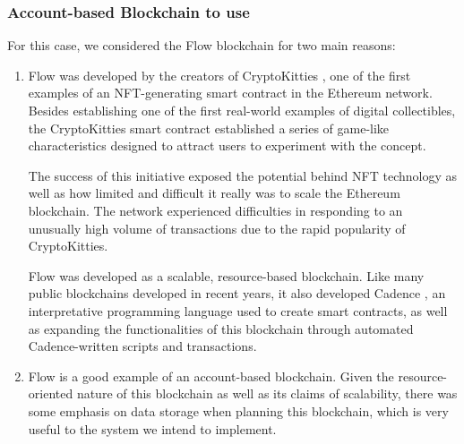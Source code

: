 \documentclass[./4_GeneralApproach.tex]{subfiles}
\begin{document}
    \subsubsection{Account-based Blockchain to use}
    For this case, we considered the Flow blockchain for two main reasons:
        \begin{enumerate}
            \item{Flow \cite{Hentschel2019a} was developed by the creators of CryptoKitties \cite{Gharegozlou2019}, one of the first examples of an NFT-generating smart contract in the Ethereum network. Besides establishing one of the first real-world examples of digital collectibles, the CryptoKitties smart contract established a series of game-like characteristics designed to attract users to experiment with the concept.
            \par
            The success of this initiative exposed the potential behind NFT technology as well as how limited and difficult it really was to scale the Ethereum blockchain. The network experienced difficulties in responding to an unusually high volume of transactions due to the rapid popularity of CryptoKitties.
            \par
            Flow was developed as a scalable, resource-based blockchain. Like many public blockchains developed in recent years, it also developed Cadence \cite{Cadence2023}, an interpretative programming language used to create smart contracts, as well as expanding the functionalities of this blockchain through automated Cadence-written scripts and transactions.}

            \item{Flow is a good example of an account-based blockchain. Given the resource-oriented nature of this blockchain as well as its claims of scalability, there was some emphasis on data storage when planning this blockchain, which is very useful to the system we intend to implement.}
        \end{enumerate}
\end{document}
